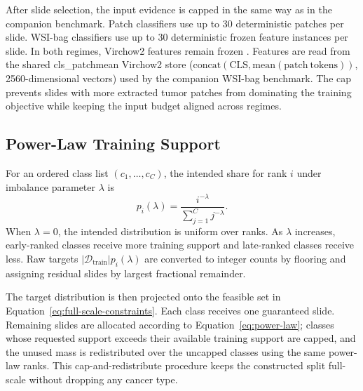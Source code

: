 \documentclass[11pt]{article}
\begin{document}
After slide selection, the input evidence is capped in the same way as in the companion benchmark. Patch classifiers use up to 30 deterministic patches per slide. WSI-bag classifiers use up to 30 deterministic frozen feature instances per slide. In both regimes, Virchow2 features remain frozen \citep{vorontsov2024virchow,zimmermann2024virchow2}. Features are read from the shared cls\_patchmean Virchow2 store ($\mathrm{concat}(\mathrm{CLS}, \mathrm{mean}(\mathrm{patch\ tokens}))$, \num{2560}-dimensional vectors) used by the companion WSI-bag benchmark. The cap prevents slides with more extracted tumor patches from dominating the training objective while keeping the input budget aligned across regimes.

\subsection{Power-Law Training Support}
For an ordered class list $(c_1,\ldots,c_C)$, the intended share for rank $i$ under imbalance parameter $\lambda$ is
\begin{equation}
  p_i(\lambda) =
  \frac{i^{-\lambda}}{\sum_{j=1}^{C} j^{-\lambda}}.
  \label{eq:power-law}
\end{equation}
\noindent When $\lambda=0$, the intended distribution is uniform over ranks. As $\lambda$ increases, early-ranked classes receive more training support and late-ranked classes receive less. Raw targets $|\mathcal{D}_{\mathrm{train}}|p_i(\lambda)$ are converted to integer counts by flooring and assigning residual slides by largest fractional remainder.

The target distribution is then projected onto the feasible set in Equation~\eqref{eq:full-scale-constraints}. Each class receives one guaranteed slide. Remaining slides are allocated according to Equation~\eqref{eq:power-law}; classes whose requested support exceeds their available training support are capped, and the unused mass is redistributed over the uncapped classes using the same power-law ranks. This cap-and-redistribute procedure keeps the constructed split full-scale without dropping any cancer type.
\end{document}
